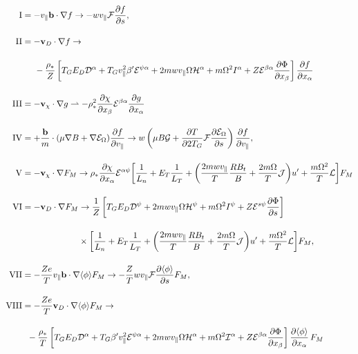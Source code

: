 \begin{align}
\label{eq:gI}{\rm I} &= - v_\parallel {\bf b} \cdot \nabla f \rightarrow - w v_{\parallel} {\cal F} \pd{f}{s}, \\
\noalign{\vskip 0.4 truecm} 
%
\label{eq:gII}{\rm II} &= - {\bf v}_D \cdot \nabla f \rightarrow \cr 
\noalign{\vskip 0.4 truecm} 
& \hspace{0.5cm} -\frac{\rho_*}{Z} \left[ T_G E_D {\cal D}^\alpha + T_G v_{\parallel}^2 \beta^\prime  {\cal E}^{\psi \alpha} + 2 m w v_{\parallel}\Omega{\cal
H}^\alpha + m \Omega^2 I^\alpha + Z{\cal E}^{\beta \alpha} \pd{\Phi}{x_\beta}\right] 
\pd{ f}{x_\alpha}  \\
\noalign{\vskip 0.4 truecm} 
%
\label{eq:gnl-term}
{\rm III} &= - {\bf v}_\chi \cdot \nabla g \rightharpoonup - \rho_*^2 \pd{\chi}{x_\beta} 
{\cal E}^{\beta \alpha} \pd{g}{x_\alpha} \\
\noalign{\vskip 0.4 truecm} 
%
\label{eq:gIV}{\rm IV} &= + \frac{\bf b}{ m }\cdot(\mu \nabla B + \nabla \cfen) \pd{ f }{v_\parallel} \rightarrow
w \left(\mu B {\cal G} + \pd{T}{2 T_G} {\cal F} \pd{ {\cal E}_\Omega }{s} \right) 
\pd{  f }{v_{\parallel}},\\
\noalign{\vskip 0.4 truecm} 
%
\label{eq:gV}{\rm V} &= - {\bf v}_\chi \cdot \nabla F_M \rightarrow  
\rho_* \pd{ \chi }{x_\alpha}  
 {\cal E}^{\alpha \psi} \biggl [ \frac{1}{L_n} + E_T \frac{1 }{ L_T} + \biggl ( \frac{2 m w v_{\parallel}}{T} 
 \frac{R B_t }{ B} + \frac{2 m \Omega }{ T} {\cal J} \biggr ) u^\prime + \frac{m \Omega^2 }{ T}{\cal L} \biggr ] F_{M} \\
\noalign{\vskip 0.4 truecm} 
%
\label{eq:gVI}{\rm VI} &= - {\bf v}_D \cdot \nabla F_M \rightarrow  \frac{1 }{ Z} \left[ T_G E_D {\cal D}^\psi + 2 m w v_{\parallel}
\Omega{\cal H}^\psi + m \Omega^2 I^\psi + Z{\cal E}^{s \psi} \pd{ \Phi }{s}\right] \\
\noalign{\vskip 0.4 truecm}
& \hspace{2.3cm} \times \biggl [ \frac{1 }{ L_n} + E_T \frac{1 }{ L_T} + \biggl ( \frac{2 m w v_{\parallel}}{ T} 
 \frac{R B_t }{ B} + \frac{2 m \Omega }{ T} {\cal J} \biggr ) u^\prime + \frac{m \Omega^2 }{ T}{\cal L} \biggr ] F_{M} ,\\ 
\noalign{\vskip 0.4 truecm} 
%
\label{eq:gVII}{\rm VII} &= - \frac{Z e }{ T} v_\parallel {\bf b} \cdot \nabla \langle \phi \rangle F_M \rightarrow - 
\frac{Z }{ T} w v_{\parallel} {\cal F} \pd{ {\langle \phi \rangle} }{s} F_{M} ,\\
\noalign{\vskip 0.4 truecm} 
%
\label{eq:gVIII}{\rm VIII} &= - \frac{Z e }{ T}{\bf v}_D \cdot \nabla \langle \phi \rangle F_M  \rightarrow \cr 
\noalign{\vskip 0.4 truecm} 
& \hspace{0.2cm} - \frac{\rho_* }{ T} \left[ T_G E_D {\cal D}^\alpha + T_G \beta^\prime v_{\parallel}^2 {\cal E}^{\psi \alpha} + 
{2 m w}v_{\parallel}\Omega{\cal H}^\alpha + {m\Omega^2 }{\cal I}^\alpha 
+ {Z} {\cal E}^{\beta \alpha} \pd{ \Phi }{x_\beta} \right] 
\pd{ \langle \phi \rangle }{x_\alpha} \, F_{M} \cr 
\noalign{\vskip 0.4 truecm} 
%
\end{align}
